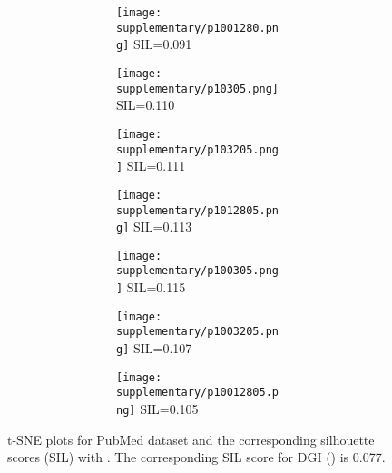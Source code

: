 \documentclass{article}
\begin{document}
\begin{figure}
\begin{subfigure}[b]{\linewidth}
\begin{subfigure}[b]{.46\linewidth}
\begin{subfigure}[b]{.32\linewidth}
        \texttt{[image: supplementary/p1001280.png]}
        SIL=0.091
        \end{subfigure}
        \caption{}
        \label{figpa0b100}
        \end{subfigure}
\end{subfigure}
\par\bigskip
\begin{subfigure}[b]{\linewidth}
    \begin{subfigure}[b]{.46\linewidth}
        \begin{subfigure}[b]{.32\linewidth}
        \centering
        \texttt{[image: supplementary/p10305.png]}
        SIL=0.110
        \end{subfigure}
        \begin{subfigure}[b]{.32\linewidth}
        \centering
        \texttt{[image: supplementary/p103205.png]}
        SIL=0.111
        \end{subfigure}
        \begin{subfigure}[b]{.32\linewidth}
        \centering
        \texttt{[image: supplementary/p1012805.png]}
        SIL=0.113
        \end{subfigure}
    \caption{}
    \label{figpa05b10}
    \end{subfigure}
    \hfill
    \begin{subfigure}[b]{.46\linewidth}
        \begin{subfigure}[b]{.32\linewidth}
        \centering
        \texttt{[image: supplementary/p100305.png]}
        SIL=0.115
        \end{subfigure}
        \begin{subfigure}[b]{.32\linewidth}
        \centering
        \texttt{[image: supplementary/p1003205.png]}
        SIL=0.107
        \end{subfigure}
        \begin{subfigure}[b]{.32\linewidth}
        \centering
        \texttt{[image: supplementary/p10012805.png]}
        SIL=0.105
        \end{subfigure}
\caption{}
        \label{figpa05b100}
        \end{subfigure}
\end{subfigure}
\caption{t-SNE plots for PubMed dataset and the corresponding silhouette scores (SIL) with . The corresponding SIL score for DGI () is 0.077.}
\label{figpubmed}
\end{figure}
\end{document}
